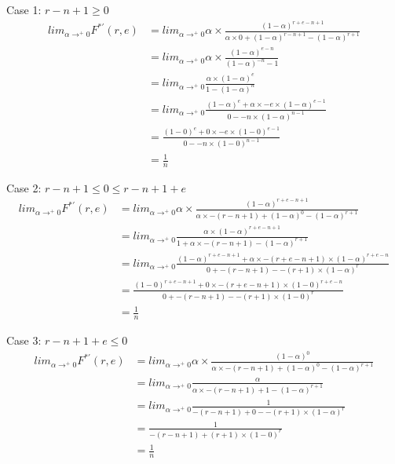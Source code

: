 \documentclass[12pt]{article}
\begin{document}
Case 1: $r-n+1 \geq 0$ 
\begin{align*}
lim_{\alpha \rightarrow^{+} 0} F^{*'}(r, e)
  &= lim_{\alpha \rightarrow^{+} 0} \alpha \times \frac{(1-\alpha)^{r + e - n + 1}}{\alpha \times 0 + (1-\alpha)^{r-n+1} - (1-\alpha)^{r+1}}
\\&= lim_{\alpha \rightarrow^{+} 0} \alpha \times \frac{(1-\alpha)^{e - n}}{(1-\alpha)^{-n} - 1}
\\&= lim_{\alpha \rightarrow^{+} 0} \frac{\alpha \times (1-\alpha)^e}{1 - (1-\alpha)^n}
\\&= lim_{\alpha \rightarrow^{+} 0} \frac{(1-\alpha)^e + \alpha \times -e \times (1-\alpha)^{e-1}}{0 - -n \times (1-\alpha)^{n-1}}
\\&= \frac{(1-0)^e + 0 \times -e \times (1-0)^{e-1}}{0 - -n \times (1-0)^{n-1}}
\\&= \frac{1}{n}
\end{align*} 

Case 2: $r-n+1 \leq 0 \leq r-n+1+e$ 
\begin{align*}
lim_{\alpha \rightarrow^{+} 0} F^{*'}(r, e)
  &= lim_{\alpha \rightarrow^{+} 0} \alpha \times \frac{(1-\alpha)^{r + e - n + 1}}{\alpha \times -(r-n+1) + (1-\alpha)^0 - (1-\alpha)^{r+1}}
\\&= lim_{\alpha \rightarrow^{+} 0} \frac{\alpha \times (1-\alpha)^{r + e - n + 1}}{1 + \alpha \times -(r-n+1) - (1-\alpha)^{r+1}}
\\&= lim_{\alpha \rightarrow^{+} 0} \frac{(1-\alpha)^{r + e - n + 1} + \alpha \times -(r + e - n + 1) \times (1-\alpha)^{r + e - n}}{0 + -(r-n+1) - -(r+1) \times (1-\alpha)^r}
\\&= \frac{(1-0)^{r + e - n + 1} + 0 \times -(r + e - n + 1) \times (1-0)^{r + e - n}}{0 + -(r-n+1) - -(r+1) \times (1-0)^r}
\\&= \frac{1}{n}
\end{align*} 

Case 3: $r-n+1+e \leq 0$ 
\begin{align*}
lim_{\alpha \rightarrow^{+} 0} F^{*'}(r, e)
  &= lim_{\alpha \rightarrow^{+} 0} \alpha \times \frac{(1-\alpha)^0}{\alpha \times -(r-n+1) + (1-\alpha)^0 - (1-\alpha)^{r+1}}
\\&= lim_{\alpha \rightarrow^{+} 0} \frac{\alpha}{\alpha \times -(r-n+1) + 1 - (1-\alpha)^{r+1}}
\\&= lim_{\alpha \rightarrow^{+} 0} \frac{1}{-(r-n+1) + 0 - -(r+1) \times (1-\alpha)^r}
\\&= \frac{1}{-(r-n+1) + (r+1) \times (1-0)^r}
\\&= \frac{1}{n}
\end{align*} 
\end{document}
